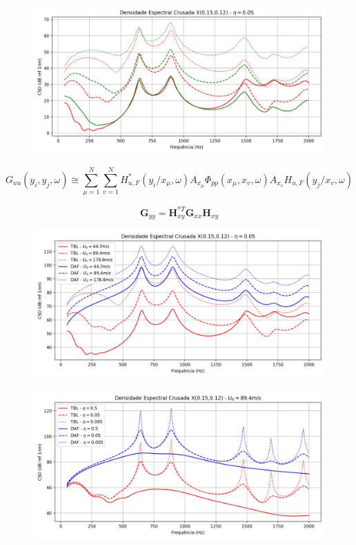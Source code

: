 \documentclass[9pt,a4paper,twoside]{rho-class/rho}
\begin{document}
\begin{figure}[H]
	\centering
	\includegraphics[width=0.9\columnwidth]{figures/csd_comp.png}
	\caption{}
	\label{fig:comp}
\end{figure}



\begin{equation}
	G_{uu}(y_i,y_j,\omega)\cong\sum_{\mu=1}^N\sum_{v=1}^NH_{u,F}^*(y_i/x_\mu,\omega)A_{x_\mu}\Phi_{pp}(x_\mu,x_v,\omega)A_{x_v}H_{u,F}(y_j/x_v,\omega)
\end{equation}

\begin{equation}
	\mathbf{G}_{yy}=\mathbf{H}_{xy}^{*T}\mathbf{G}_{xx}\mathbf{H}_{xy}
\end{equation}


\begin{figure}[H]
	\centering
	\includegraphics[width=0.9\columnwidth]{figures/csd_vel.png}
	\caption{}
	\label{fig:csdvel}
\end{figure}

\begin{figure}[H]
	\centering
	\includegraphics[width=0.9\columnwidth]{figures/csd_eta.png}
	\caption{}
	\label{fig:csdeta}
\end{figure}



\printbibliography

\end{document}
